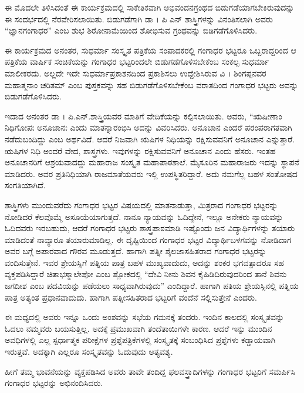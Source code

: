 {ಈ ಮೊದಲೇ ತಿಳಿಸಿದಂತೆ ಈ ಕಾರ್ಯಕ್ರಮದಲ್ಲಿ ಸಾಕೇತಿಕವಾಗಿ ಅಭಿವಂದನ\-ಗ್ರಂಥದ ಬಿಡುಗಡೆಯಾಗಬೇಕಿರುವುದನ್ನು ಈ ಸಂದರ್ಭದಲ್ಲಿ ನೆರವೇರಿಸಲಾಯಿತು. ಬಿಡುಗಡೆಗಾಗಿ ಡಾ । ಪಿ ಎನ್ ಶಾಸ್ತ್ರಿಗಳನ್ನು ವಿನಂತಿಸಲಾಗಿ ಅವರು “ಜ್ಞಾನಗಂಗಾಧರ” ಎಂಬ ಶುಭ ಶಿರೋನಾಮೆಯಿಂದ ಶೋಭಿಸುವ ಗ್ರಂಥವನ್ನು ಬಿಡಿಗಡೆಗೊಳಿಸಿದರು. 

ಈ ಕಾರ್ಯಕ್ರಮದ ಅನಂತರ, ಸುಧರ್ಮಾ ಸಂಸ್ಕೃತ ಪತ್ರಿಕೆಯ ಸಂಪಾದಕರಲ್ಲಿ ಗಂಗಾಧರ ಭಟ್ಟರೂ ಒಬ್ಬರಾದ್ದರಿಂದ ಆ ಪತ್ರಿಕೆಯ ವಾರ್ಷಿಕ ಸಂಚಿಕೆಯನ್ನು ಗಂಗಾಧರ ಭಟ್ಟರಿಂದಲೇ ಬಿಡುಗಡೆಗೊಳಿಸಬೇಕೆಂಬ ಸಂಕಲ್ಪ ಸುಧರ್ಮಾ ಮಾಲೀಕರದು. ಅಲ್ಲದೇ ಇದೇ ಸುಧರ್ಮಾಪ್ರಕಾಶನದಿಂದ ಪ್ರಕಾಶಿಸಲು ಉದ್ದೇಶಿಸಿರುವ ವಿ । ಶಿಂಗಪ್ಪನವರ ಮಹಾತ್ಮನಾಂ ಚರಿತಮ್ ಎಂಬ ಪುಸ್ತಕವನ್ನು ಸಹ ಬಿಡುಗಡೆಗೊಳಿಸಬೇಕೆಂಬ ವರಾತದಿಂದ ಗಂಗಾಧರ ಭಟ್ಟರು ಅವನ್ನು ಬಿಡುಗಡೆಗೊಳಿಸಿದರು.
\vskip 5pt

ಇದಾದ ಅನಂತರ ಡಾ । ಪಿ.ಎನ್.ಶಾಸ್ತ್ರಿಯವರ ಮಾತಿಗೆ ವೇದಿಕೆಯನ್ನು ಕಲ್ಪಿಸ\-ಲಾಯಿತು. ಅವರು, “ಋಷೀಣಾಂ ನಿಧಿಗೋಪಃ ಅನೂಚಾನಃ ಎಂದು \hbox{ಮಾತನ್ನಾರಂಭಿಸಿ} ಅದನ್ನು ವಿವರಿಸಿದರು. ಅನೂಚಾನ ಎಂದರೆ ಪರಂಪರಾಗತವಾಗಿ ನಡೆದುಬಂದಿದ್ದು ಎಂಬ ಅರ್ಥವಿದೆ. ಆದರೆ ನಿಜವಾಗಿ ಋಷಿಗಳ ನಿಧಿಯನ್ನು ರಕ್ಷಿಸುವವನಿಗೆ ಅನೂಚಾನ ಎನ್ನುತ್ತಾರೆ. ಋಷಿಗಳ ನಿಧಿ ಅಂದರೆ \enginline{-} ವೇದ, ಶಾಸ್ತ್ರಗಳು. ಇವುಗಳನ್ನು ರಕ್ಷಿಸುವವನಿಗೆ ಅನೂಚಾನ ಎಂದು ಹೆಸರು. ಇಂತಹ ಅನೂಚಾನರಿಗೆ ಆಶ್ರಯವಾದದ್ದು ಮಹಾರಾಜ ಸಂಸ್ಕೃತ ಮಹಾಪಾಠಶಾಲೆ. ಮೈಸೂರಿನ ಮಹಾರಾಜರು ಇದನ್ನು ಸ್ಥಾಪನೆ ಮಾಡಿದರು. ಅವರ ಪ್ರತಿನಿಧಿಯಾಗಿ ರಾಜಮಾತೆಯವರು ಇಲ್ಲಿ ಉಪಸ್ಥಿತರಿದ್ದಾರೆ. ಅದು ನಮಗೆಲ್ಲ ಬಹಳ ಸಂತೋಷದ ಸಂಗತಿಯಾಗಿದೆ. 
\vskip 5pt

ಶಾಸ್ತ್ರಿಗಳು ಮುಂದುವರೆದು ಗಂಗಾಧರ ಭಟ್ಟರ ವಿಷಯದಲ್ಲಿ ಮಾತನಾಡುತ್ತಾ, \enginline{-} ಮಿತ್ರರಾದ ಗಂಗಾಧರ ಭಟ್ಟರನ್ನು ನೋಡಿದರೆ ಕೆಲವೊಮ್ಮೆ ಅಸೂಯೆಯಾ\-ಗುತ್ತದೆ. ನಾನೂ ನ್ಯಾಯವನ್ನು ಓದಿದ್ದೇನೆ, ಇಲ್ಲೂ ಅನೇಕರು ನ್ಯಾಯವನ್ನು ಓದಿದವರು ಇರಬಹುದು, ಆದರೆ ಗಂಗಾಧರ ಭಟ್ಟರು ಶಾಸ್ತ್ರಪಾಠಮಾಡಿ ಇಷ್ಟೊಂದು ಜನ ವಿದ್ಯಾರ್ಥಿಗಳನ್ನು ತಯಾರು ಮಾಡಿದಂತೆ ನಾವ್ಯಾರೂ ತಯಾರುಮಾಡಿಲ್ಲ. ಈ ದೃಷ್ಟಿಯಿಂದ ಗಂಗಾಧರ ಭಟ್ಟರ ವಿದ್ಯಾರ್ಥಿಬಳಗವನ್ನು ನೋಡಿದಾಗ ಅವರ ಬಗ್ಗೆ ಅಪಾರವಾದ ಗೌರವ ಮೂಡುತ್ತದೆ. ಹಾಗಾಗಿ ಪತ್ನೀ\enginline{-} ಶೈಲಜಾಸಹಿತರಾದ ಗಂಗಾಧರ ಭಟ್ಟರನ್ನು ವಂದಿಸುತ್ತೇನೆ. ಇವರ ಶ್ರೇಯಸ್ಸಿಗೆ ಪತ್ನಿಯ ಪಾತ್ರ ಬಹಳ ಮುಖ್ಯ\-ವಾದುದು, ಅದನ್ನು ಶಂಕರ ಭಗವತ್ಪಾದರೂ ಸಹ ವ್ಯಕ್ತಪಡಿಸಿದ್ದಾರೆ ಚಿತಾಭಸ್ಮಾಲೇಪೋ ಎಂಬ ಶ್ಲೋಕದಲ್ಲಿ \enginline{-} “ದೇವಿ ನೀನು ಶಿವನ ಕೈಹಿಡಿದಿರುವುದರಿಂದ ತಾನೆ ಶಿವನು ಜಗದೀಶ ಎಂಬ ಪದವಿಯನ್ನು ಪಡೆಯಲು ಸಾಧ್ಯವಾಗಿರುವುದು” ಎಂದಿದ್ದಾರೆ. ಹಾಗಾಗಿ ಪತಿಯ ಶ್ರೇಯಸ್ಸಿನಲ್ಲಿ ಪತ್ನಿಯ ಪಾತ್ರ ಅತ್ಯಂತ ಪ್ರಧಾನವಾದುದು. ಹಾಗಾಗಿ ಪತ್ನೀ\-ಸಹಿತರಾದ ಭಟ್ಟರಿಗೆ ವಂದೆನೆ ಸಲ್ಲಿಸುತ್ತೇನೆ ಎಂದರು.

ಈ ಮಧ್ಯದಲ್ಲಿ ಅವರು ಇನ್ನೂ ಒಂದು ಅಂಶವನ್ನು ಸಭೆಯ ಗಮನಕ್ಕೆ ತಂದರು. ಇಂದಿನ ಕಾಲದಲ್ಲಿ ಸಂಸ್ಕೃತವನ್ನು ಓದಲು ನಮ್ಮವರು ಬಯಸುತ್ತಿಲ್ಲ. ಅದಕ್ಕೆ ಪ್ರಮುಖವಾಗಿ ತಂದೆತಾಯಿಗಳೇ ಕಾರಣ. ಆದರೆ ಇನ್ನು ಮುಂದಿನ ಅವಧಿಗಳಲ್ಲಿ ಎಲ್ಲ ಸ್ಪರ್ಧಾತ್ಮಕ ಪರೀಕ್ಷೆಗಳ ಪ್ರಶ್ನೆಪತ್ರಿಕೆಗಳಲ್ಲಿ ಸಂಸ್ಕೃತಕ್ಕೆ ಸಂಬಂಧಿಸಿದ ಪ್ರಶ್ನೆಗಳು ಕಡ್ಡಾಯವಾಗಿ ಇರುತ್ತವೆ. ಅದಕ್ಕಾಗಿ ಎಲ್ಲರೂ ಸಂಸ್ಕೃತವನ್ನು ಓದುವುದು ಅತ್ಯವಶ್ಯ.  

ಹೀಗೆ ತಮ್ಮ ಭಾವನೆಯನ್ನು ವ್ಯಕ್ತಪಡಿಸಿದ ಅವರು ತಾವೇ ತಂದಿದ್ದ ಫಲವಸ್ತ್ರಾದಿ\-ಗಳನ್ನು ಗಂಗಾಧರ ಭಟ್ಟರಿಗೆ ಸಮರ್ಪಿಸಿ ಗಂಗಾಧರ ಭಟ್ಟರನ್ನು ಅಭಿನಂದಿಸಿದರು.

}
